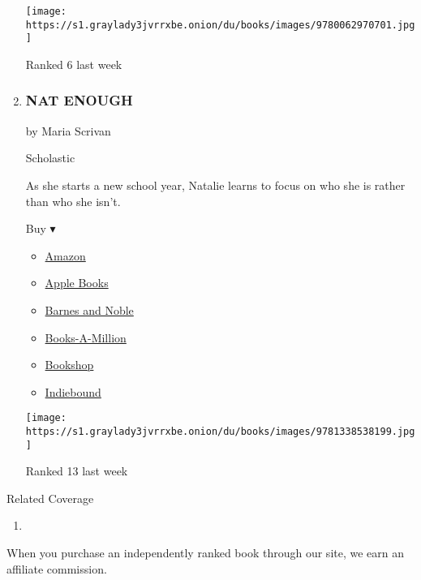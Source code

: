 \begin{enumerate}
  \texttt{[image: https://s1.graylady3jvrrxbe.onion/du/books/images/9780062970701.jpg]}

  Ranked 6 last week
\item
  \hypertarget{nat-enough}{%
  \subsubsection{NAT ENOUGH}\label{nat-enough}}

  by Maria Scrivan

  Scholastic

  As she starts a new school year, Natalie learns to focus on who she is
  rather than who she isn't.

  Buy ▾

  \begin{itemize}
  \tightlist
  \item
    \href{https://www.amazon.com/dp/1338538195?tag=NYTBSREV-20\&tag=NYTBS-20}{Amazon}
  \item
    \href{https://du-gae-books-dot-nyt-du-prd.appspot.com/buy?title=NAT+ENOUGH\&author=Maria+Scrivan}{Apple
    Books}
  \item
    \href{https://www.anrdoezrs.net/click-7990613-11819508?url=https\%3A\%2F\%2Fwww.barnesandnoble.com\%2Fw\%2F\%3Fean\%3D9781338538199}{Barnes
    and Noble}
  \item
    \href{https://www.anrdoezrs.net/click-7990613-35140?url=https\%3A\%2F\%2Fwww.booksamillion.com\%2Fp\%2FNAT\%2BENOUGH\%2FMaria\%2BScrivan\%2F9781338538199}{Books-A-Million}
  \item
    \href{https://bookshop.org/a/3546/9781338538199}{Bookshop}
  \item
    \href{https://www.indiebound.org/book/9781338538199?aff=NYT}{Indiebound}
  \end{itemize}

  \texttt{[image: https://s1.graylady3jvrrxbe.onion/du/books/images/9781338538199.jpg]}

  Ranked 13 last week
\end{enumerate}

Related Coverage

\begin{enumerate}
\def\labelenumi{\arabic{enumi}.}
\tightlist
\item
  \href{https://www.nytimes3xbfgragh.onion/2020/07/31/books/review/the-system-robert-reich-break-em-up-zephyr-teachout.html}{}
\end{enumerate}

When you purchase an independently ranked book through our site, we earn
an affiliate commission.

